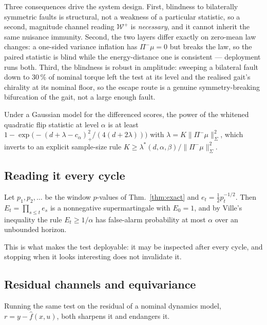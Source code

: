 Three consequences drive the system design. First, blindness to bilaterally symmetric faults is structural, not a
weakness of a particular statistic, so a second, magnitude channel reading $\mathcal{W}^+$ is \emph{necessary}, and it
cannot inherit the same nuisance immunity. Second, the two layers differ exactly on zero-mean law changes: a one-sided
variance inflation has $\Pi^-\mu=0$ but breaks the law, so the paired statistic is blind while the energy-distance one
is consistent --- deployment runs both. Third, the blindness is robust in amplitude: sweeping a bilateral fault down to
$30\,\%$ of nominal torque left the test at its level and the realised gait's chirality at its nominal floor, so the
escape route is a genuine symmetry-breaking bifurcation of the gait, not a large enough fault.

\begin{proposition}
\label{prop:power}
Under a Gaussian model for the differenced scores, the power of the whitened quadratic flip statistic at level $\alpha$
is at least $1-\exp\bigl(-(d+\lambda-c_\alpha)_+^2/(4(d+2\lambda))\bigr)$ with $\lambda=K\|\Pi^-\mu\|^2_{\Sigma}$, which
inverts to an explicit sample-size rule $K\ge\lambda^*(d,\alpha,\beta)/\|\Pi^-\mu\|^2_{\Sigma}$.
\end{proposition}

\subsection{Reading it every cycle}

\begin{proposition}
\label{prop:seq}
Let $p_1,p_2,\dots$ be the window $p$-values of Thm.~\ref{thm:exact} and $e_t=\tfrac12 p_t^{-1/2}$. Then
$E_t=\prod_{s\le t}e_s$ is a nonnegative supermartingale with $E_0=1$, and by Ville's inequality the rule
$E_t\ge 1/\alpha$ has false-alarm probability at most $\alpha$ over an unbounded horizon.
\end{proposition}
This is what makes the test deployable: it may be inspected after every cycle, and stopping when it looks interesting
does not invalidate it.

\subsection{Residual channels and equivariance}

Running the same test on the residual of a nominal dynamics model, $r=y-\hat f(x,u)$, both sharpens it and endangers it.

